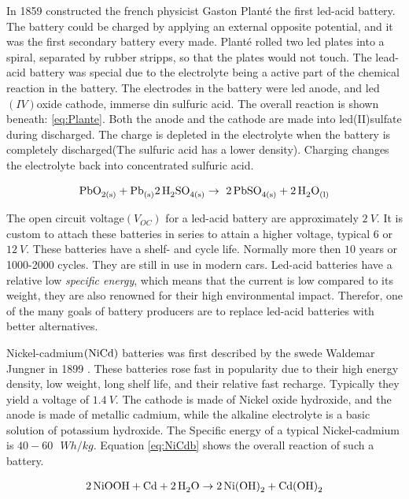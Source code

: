 In 1859 constructed the french physicist Gaston Planté the first led-acid battery. The battery could be charged by applying an external opposite potential, and it was the first secondary battery every made. Planté rolled two led plates into a spiral, separated by rubber stripps, so that the plates would not touch. The lead-acid battery was special due to the electrolyte being a active part of the chemical reaction in the battery. The electrodes in the battery were led anode, and led$(IV)$oxide cathode, immerse din sulfuric acid. The overall reaction is shown beneath: \ref{eq:Plante}. Both the anode and the cathode are made into led(II)sulfate during discharged. The charge is depleted in the electrolyte when the battery is completely discharged(The sulfuric acid has a lower density). Charging changes the electrolyte back into concentrated sulfuric acid. 

\begin{align}\label{eq:Plante}
\ce{PbO_{2(s)}} + \ce{Pb_{(s)}} \ce{2H_2SO_{4(s)}} \rightarrow \ce{2PbSO_{4(s)}} +\ce{2H_2O_{(l)}}
\end{align}

The open circuit voltage$(V_{OC})$ for a led-acid battery are approximately $\SI{2}{V}$. It is custom to attach these batteries in series to attain a higher voltage, typical $6$ or $\SI{12}{V}$. These batteries have a shelf- and cycle life. Normally more then $10$ years or 1000-2000 cycles. They are still in use in modern cars. Led-acid batteries have a relative low \textit{specific energy}, which means that the current is low compared to its weight, they are also renowned for their high environmental impact. Therefor, one of the many goals of battery producers are to replace led-acid batteries with better alternatives.  

Nickel-cadmium$(\ce{NiCd})$ batteries was first described by the swede Waldemar Jungner in 1899 \cite{daniel2012handbook}. These batteries rose fast in popularity due to their high energy density, low weight, long shelf life, and their relative fast recharge. Typically they yield a voltage of $\SI{1.4}{V}$. The cathode is made of Nickel oxide hydroxide, and the anode is made of metallic cadmium, while the alkaline electrolyte is a basic solution of potassium hydroxide. The Specific energy of a typical Nickel-cadmium is $40-60\text{ }\si{W h/kg}$. Equation \ref{eq:NiCdb} shows the overall reaction of such a battery.

\begin{align}\label{eq:NiCdb}
\ce{2NiOOH} + \ce{Cd} + \ce{2H_2O} \rightarrow \ce{2Ni(OH)_2} + \ce{Cd(OH)_2}
\end{align}

